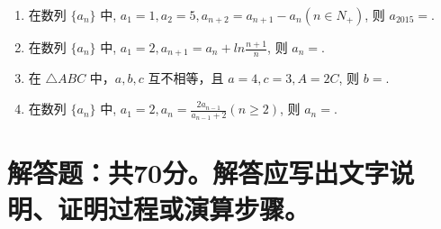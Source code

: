 \documentclass[17pt,twoside,space]{ctexart}
\begin{document}
\begin{enumerate}[itemsep=-0.3em,topsep=0pt,resume]%

\item 在数列 $\{a_n\}$ 中, $a_1=1, a_2=5, a_{n+2}=a_{n+1}-a_n (n\in N_+)$, 则 $a_{2015}=$\blank. 

\item 在数列 $\{a_n\}$ 中, $a_1=2, a_{n+1}=a_n+ln\frac{n+1}{n}$, 则 $a_n=$\blank.

\item 在 $\triangle ABC$ 中，$a,b,c$ 互不相等，且 $a=4, c=3, A=2C$, 则 $b=$\blank. 

\item  在数列 $\{a_n\}$ 中, $a_1=2, a_n=\frac{2a_{n-1}}{a_{n-1}+2} (n\geqslant 2)$, 则 $a_n=$\blank. 

\end{enumerate}


\section{解答题：共70分。解答应写出文字说明、证明过程或演算步骤。}
\end{document}
